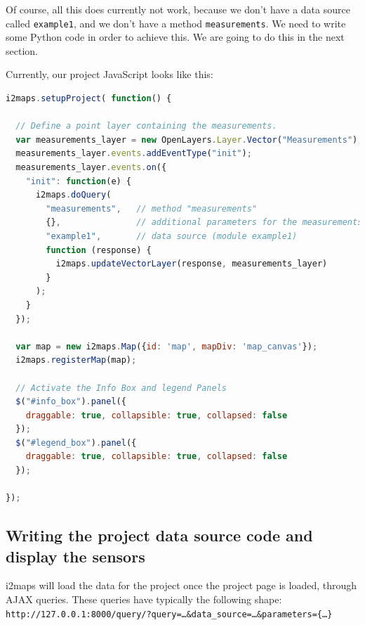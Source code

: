 \documentclass[11pt]{article}
\begin{document}
Of course, all this does currently not work, because we don't have a data source called \texttt{example1}, and we don't have a method \texttt{measurements}. We need to write some Python code in order to achieve this. We are going to do this in the next section.

Currently, our project JavaScript looks like this:

\begin{lstlisting}[language=JavaScript]
i2maps.setupProject( function() {

  // Define a point layer containing the measurements.
  var measurements_layer = new OpenLayers.Layer.Vector("Measurements");
  measurements_layer.events.addEventType("init");
  measurements_layer.events.on({
    "init": function(e) {
      i2maps.doQuery(
        "measurements",   // method "measurements"
        {},               // additional parameters for the measurements method
        "example1",       // data source (module example1)
        function (response) {
          i2maps.updateVectorLayer(response, measurements_layer)
        }
      );
    }
  });

  var map = new i2maps.Map({id: 'map', mapDiv: 'map_canvas'});
  i2maps.registerMap(map);
	
  // Activate the Info Box and legend Panels
  $("#info_box").panel({
    draggable: true, collapsible: true, collapsed: false
  });
  $("#legend_box").panel({
    draggable: true, collapsible: true, collapsed: false
  });
  
});
\end{lstlisting}





\subsection{Writing the project data source code and display the sensors}

i2maps will load the data for the project once the project page is loaded, through AJAX queries. These queries have typically the following shape: \\

\texttt{http://127.0.0.1:8000/query/?query=\dots\&data\_source=\dots\&parameters=\{\dots\}} \\
\end{document}
